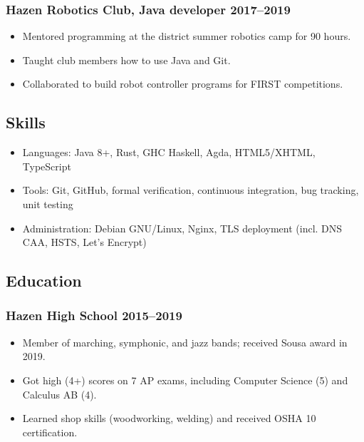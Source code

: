 \documentclass[12pt]{extarticle}
\begin{document}
\subsubsection{Hazen Robotics Club, Java developer \hfill 2017–2019}
\begin{itemize}
\item Mentored programming at the district summer robotics camp for 90 hours.
\item Taught club members how to use Java and Git.
\item Collaborated to build robot controller programs for FIRST competitions.
\end{itemize}

\subsection{Skills}
\begin{itemize}
\item Languages: Java 8+, Rust, GHC Haskell, Agda, HTML5/XHTML, TypeScript
\item Tools: Git, GitHub, formal verification, continuous integration, bug tracking, unit testing
\item Administration: Debian GNU/Linux, Nginx, TLS deployment (incl. DNS CAA, HSTS, Let's Encrypt)
\end{itemize}


\subsection{Education}
\subsubsection{Hazen High School \hfill 2015–2019}
\begin{itemize}
\item Member of marching, symphonic, and jazz bands; received Sousa award in 2019.
\item Got high (4+) scores on 7 AP exams, including Computer Science (5) and Calculus AB (4).
\item Learned shop skills (woodworking, welding) and received OSHA 10 certification.
\end{itemize}
\end{document}
